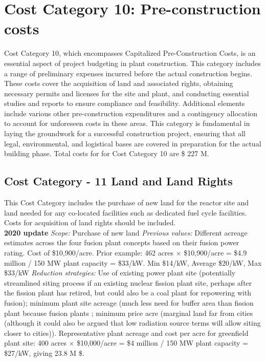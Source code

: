 \section{Cost Category 10: Pre-construction costs} 

Cost Category 10, which encompasses Capitalized Pre-Construction Costs, is an essential aspect of project budgeting in plant construction. This category includes a range of preliminary expenses incurred before the actual construction begins. These costs cover the acquisition of land and associated rights, obtaining necessary permits and licenses for the site and plant, and conducting essential studies and reports to ensure compliance and feasibility. Additional elements include various other pre-construction expenditures and a contingency allocation to account for unforeseen costs in these areas. This category is fundamental in laying the groundwork for a successful construction project, ensuring that all legal, environmental, and logistical bases are covered in preparation for the actual building phase.  Total costs for for Cost Category 10 are \$ 227 M.

\subsection*{Cost Category - 11 Land and Land Rights}
This Cost Category includes the purchase of new land for the reactor site and land needed for any co-located facilities such as dedicated fuel cycle facilities.  Costs for acquisition of land rights should be included. \\

 \textbf{2020 update} 
\emph{Scope: }Purchase of new land 
 \emph{Previous values: } 
Different acreage estimates across the four fusion plant concepts based on their fusion power rating. Cost of \$10,900/acre. 
Prior example: 462 acres $\times$ \$10,900/acre = \$4.9 million / 150 MW plant capacity =  \$33/kW.  Min \$14/kW, Average \$20/kW, Max \$33/kW  
 \emph{Reduction strategies: } 
 Use of existing power plant site (potentially streamlined siting process if an existing nuclear fission plant site, perhaps after the fission plant has retired, but could also be a coal plant for repowering with fusion); minimum plant site acreage (much less need for buffer area than fission plant because fusion plants ; minimum price acre (marginal land far from cities (although it could also be argued that low radiation source terms will allow siting closer to cities)). 
Representative plant acreage and cost per acre for greenfield plant site: 400 acres $\times$ \$10,000/acre = \$4 million / 150 MW plant capacity = \$27/kW, giving 23.8 M \$.  \\

